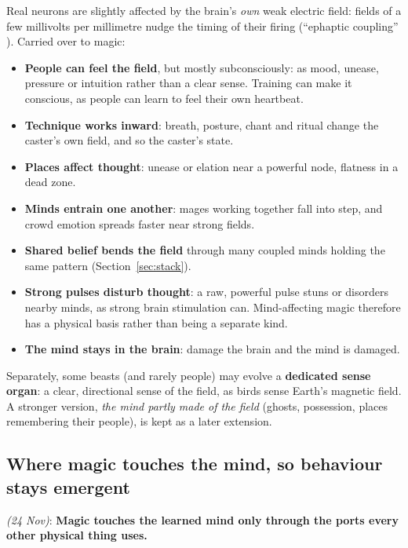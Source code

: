 \documentclass[11pt,a4paper]{article}
\newcommand{\decision}[3]{\par\smallskip\noindent{\color{dec}\textbf{Decision #1}} \textit{(#2)}: \textbf{#3}\par}
\begin{document}
Real neurons are slightly affected by the brain's \emph{own} weak electric field: fields of a few millivolts per millimetre nudge the timing of their firing (``ephaptic coupling'' \cite{anastassiou,frohlich}). Carried over to magic:
\begin{itemize}
  \item \textbf{People can feel the field}, but mostly subconsciously: as mood, unease, pressure or intuition rather than a clear sense. Training can make it conscious, as people can learn to feel their own heartbeat.
  \item \textbf{Technique works inward}: breath, posture, chant and ritual change the caster's own field, and so the caster's state.
  \item \textbf{Places affect thought}: unease or elation near a powerful node, flatness in a dead zone.
  \item \textbf{Minds entrain one another}: mages working together fall into step, and crowd emotion spreads faster near strong fields.
  \item \textbf{Shared belief bends the field} through many coupled minds holding the same pattern (Section~\ref{sec:stack}).
  \item \textbf{Strong pulses disturb thought}: a raw, powerful pulse stuns or disorders nearby minds, as strong brain stimulation can. Mind-affecting magic therefore has a physical basis rather than being a separate kind.
  \item \textbf{The mind stays in the brain}: damage the brain and the mind is damaged.
\end{itemize}
Separately, some beasts (and rarely people) may evolve a \textbf{dedicated sense organ}: a clear, directional sense of the field, as birds sense Earth's magnetic field. A stronger version, \emph{the mind partly made of the field} (ghosts, possession, places remembering their people), is kept as a later extension.

\subsection{Where magic touches the mind, so behaviour stays emergent}

\decision{Q2.5}{24 Nov}{Magic touches the learned mind only through the ports every other physical thing uses.}
\end{document}
